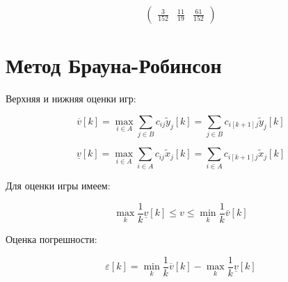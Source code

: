 \documentclass[12pt]{extarticle}
\begin{document}
    $$\left(\begin{array}{rrr}
\frac{3}{152} & \frac{11}{19} & \frac{61}{152}
\end{array}\right)$$

    

    \section*{\centering Метод Брауна-Робинсон}\label{ux43cux435ux442ux43eux434-ux431ux440ux430ux443ux43dux430-ux440ux43eux431ux438ux43dux441ux43eux43d}

    Верхняя и нижняя оценки игр:

\[\overline{v}[k] = \max_{i \in A} \sum_{j \in B}c_{ij} \tilde{y}_{j}[k] = \sum_{j \in B}c_{i[k + 1]j}\tilde{y}_{j}[k]\]

\[\underline{v}[k] = \max_{i \in A} \sum_{i \in A}c_{ij} \tilde{x}_{j}[k] = \sum_{i \in A}c_{i[k + 1]j}\tilde{x}_{j}[k]\]

Для оценки игры имеем:

\[\max_{k} \frac{1}{k} \underline{v}[k] \leq v \leq \min_{k} \frac{1}{k} \overline{v}[k]\]

Оценка погрешности:

\[\varepsilon [k] = \min_{k} \frac{1}{k} \overline{v}[k] - \max_{k} \frac{1}{k} \underline{v}[k]\]
\end{document}
